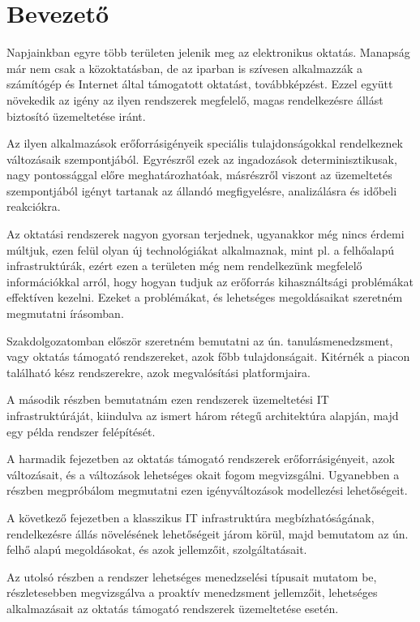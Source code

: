 \chapter*{Bevezető}

Napjainkban egyre több területen jelenik meg az elektronikus oktatás. Manapság már nem csak a közoktatásban, de az iparban is szívesen alkalmazzák a számítógép és Internet által támogatott oktatást, továbbképzést. Ezzel együtt növekedik az igény az ilyen rendszerek megfelelő, magas rendelkezésre állást biztosító üzemeltetése iránt.

Az ilyen alkalmazások erőforrásigényeik speciális tulajdonságokkal rendelkeznek változásaik szempontjából. Egyrészről ezek az ingadozások determinisztikusak, nagy pontossággal előre meghatározhatóak, másrészről viszont az üzemeltetés szempontjából igényt tartanak az állandó megfigyelésre, analizálásra és időbeli reakciókra.

Az oktatási rendszerek nagyon gyorsan terjednek, ugyanakkor még nincs érdemi múltjuk, ezen felül olyan új technológiákat alkalmaznak, mint pl. a felhőalapú infrastruktúrák, ezért ezen a területen még nem rendelkezünk megfelelő információkkal arról, hogy hogyan tudjuk az erőforrás kihasználtsági problémákat effektíven kezelni. Ezeket a problémákat, és lehetséges megoldásaikat szeretném megmutatni írásomban.

Szakdolgozatomban először szeretném bemutatni az ún. tanulásmenedzsment, vagy oktatás támogató rendszereket, azok főbb tulajdonságait. Kitérnék a piacon található kész rendszerekre, azok megvalósítási platformjaira.

A második részben bemutatnám ezen rendszerek üzemeltetési IT infrastruktúráját, kiindulva az ismert három rétegű architektúra alapján, majd egy példa rendszer felépítését.

A harmadik fejezetben az oktatás támogató rendszerek erőforrásigényeit, azok változásait, és a változások lehetséges okait fogom megvizsgálni. Ugyanebben a részben megpróbálom megmutatni ezen igényváltozások modellezési lehetőségeit.

A következő fejezetben a klasszikus IT infrastruktúra megbízhatóságának, rendelkezésre állás növelésének lehetőségeit járom körül, majd bemutatom az ún. felhő alapú megoldásokat, és azok jellemzőit, szolgáltatásait.

Az utolsó részben a rendszer lehetséges menedzselési típusait mutatom be, részletesebben megvizsgálva a proaktív menedzsment jellemzőit, lehetséges alkalmazásait az oktatás támogató rendszerek üzemeltetése esetén.
 